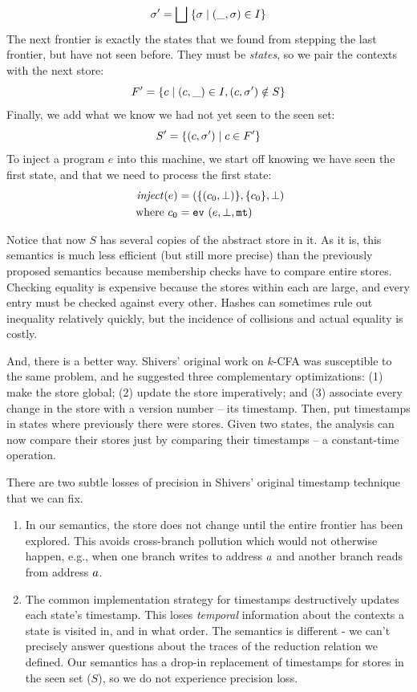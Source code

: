 \documentclass[preprint,onecolumn,9pt]{sigplanconf} %
\begin{document}
\begin{equation*}
\sigma' = \bigsqcup\; \{\sigma \mid (\_,\sigma) \in I\}
\end{equation*}
%
The next frontier is exactly the states that we found from stepping
the last frontier, but have not seen before. They must be
\emph{states}, so we pair the contexts with the next store:
%
\begin{equation*}
F' = \{c \mid (c,\_) \in I, (c,\sigma') \notin S\}
\end{equation*}
%
Finally, we add what we know we had not yet seen to the seen set:
\begin{equation*}
  S' = \{(c,\sigma') \mid c \in F'\}
\end{equation*}
%
To inject a program $e$ into this machine, we start off knowing we
have seen the first state, and that we need to process the first
state:
\begin{align*}
\mathit{inject}(e) &= (\{(c_0, \bot)\},\{c_0\},\bot) \\
\text{ where } c_0 &= {\tt ev}{\ }({e,\bot,{\tt mt}})
\end{align*}

Notice that now $S$ has several copies of the abstract store in it. As
it is, this semantics is much less efficient (but still more precise)
than the previously proposed semantics because membership checks have
to compare entire stores. Checking equality is expensive because the stores within each are
large, and every entry must be checked against every other. Hashes can
sometimes rule out inequality relatively quickly, but the incidence of
collisions and actual equality is costly.

And, there is a better way. Shivers' original work on $k$-CFA was
susceptible to the same problem, and he suggested three complementary
optimizations: (1) make the store global; (2) update the store
imperatively; and (3) associate every change in the store with a
version number -- its timestamp. Then, put timestamps in states
where previously there were stores. Given two states, the analysis can
now compare their stores just by comparing their timestamps -- a
constant-time operation.

There are two subtle losses of precision in Shivers' original
timestamp technique that we can fix.

\begin{enumerate}
\item{In our semantics, the store does not change until the entire
    frontier has been explored. This avoids cross-branch pollution
    which would not otherwise happen, e.g., when one branch writes to
    address $a$ and another branch reads from address
    $a$.}
\item{The common implementation strategy for timestamps destructively
    updates each state's timestamp. This loses \emph{temporal}
    information about the contexts a state is visited in, and in what
    order. The semantics is different - we can't precisely answer
    questions about the traces of the reduction relation we defined.
    Our semantics has a drop-in replacement of timestamps for stores
    in the seen set ($S$), so we do not experience precision loss.}
\end{enumerate}
\end{document}
